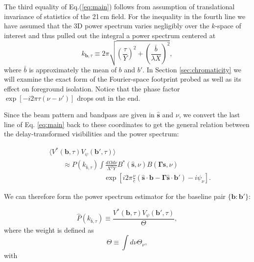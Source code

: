 \documentclass[twocolumn,apj,numberedappendix]{emulateapj}
\renewcommand\[{\begin{equation}}
\renewcommand\]{\end{equation}}
\begin{document}
The third equality of Eq.(\ref{eq:main}) follows from assumption of translational invariance of statistics of the 21\,cm field. 
For the inequality in the fourth line we have assumed that the  3D power spectrum varies negligibly over the $k$-space of interest and thus pulled out the integral a power spectrum centered at 
\[
k_{\boldsymbol{b}, \tau} \equiv 2\pi \sqrt{\left(\frac{\tau}{Y}\right)^2 + \left(\frac{\bar{b}}{\lambda X}\right)^2},
\label{eq:kbtau}
\]
where $\bar{b}$ is approximately the mean of $b$ and $b'$. 
In Section \ref{sec:chromaticity} we will examine the exact form of the Fourier-space footprint probed as well as its effect on foreground isolation.  
Notice that the phase factor $\exp\left[-i2\pi\tau\left(\nu-\nu'\right)\right]$
drops out in the end.

Since the beam pattern and bandpass are given in $\hat{\boldsymbol{s}}$
and $\nu$, we convert the last line of Eq. \eqref{eq:main} back to these coordinates to get
the general relation between the delay-transformed visibilities and
the power spectrum:

\begin{equation}
\begin{aligned} & \langle V^{*}(\boldsymbol{b},\tau)V_{\psi}(\boldsymbol{b'},\tau)\rangle\\
 & \qquad \approx P(k_{\bar{b}, \tau})\int\frac{d\Omega d\nu}{X^{2}Y}B^{*}(\hat{\boldsymbol{s}},\nu)B(\boldsymbol{\Gamma}\hat{\boldsymbol{s}},\nu)\\
 & \qquad \qquad \qquad \qquad \exp\left[i2\pi\frac{\nu}{c}\left(\hat{\boldsymbol{s}}\cdot\boldsymbol{b}-\boldsymbol{\Gamma}\hat{\boldsymbol{s}}\cdot\boldsymbol{b'}\right)-i\psi_{\nu}\right].
 \end{aligned}
\label{eq:final}
\end{equation}

We can therefore form the power spectrum estimator for the baseline pair $\{\boldsymbol b: \boldsymbol  b'\}$:
 
\begin{equation}
 \hat{P}(k_{\bar{b}, \tau}) \equiv \frac{V^{*}(\boldsymbol{b},\tau)V_{\psi}(\boldsymbol{b'},\tau)}{\Theta}, 
 \label{eq:opp}
\end{equation}
where the weight is defined as 
\begin{equation}
\Theta \equiv\int d\nu \Theta_{\nu}, 
\label{eq:Theta}
\end{equation}
with  
\end{document}
